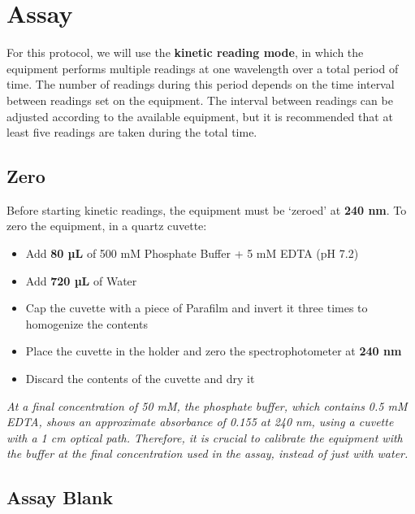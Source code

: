 \documentclass[
  9pt,
  american,
  a5paper,
  extrafontsizes,onecolumn,openright
  ]{memoir}
\providecommand{\tightlist}{%
  \setlength{\itemsep}{0pt}\setlength{\parskip}{0pt}}
\newlength{\rf}
\begin{document}
\section{Assay}\label{assay_general}

For this protocol, we will use the \textbf{kinetic reading mode}, in which the equipment performs multiple readings at one wavelength over a total period of time. The number of readings during this period depends on the time interval between readings set on the equipment. The interval between readings can be adjusted according to the available equipment, but it is recommended that at least five readings are taken during the total time.

\subsection{Zero}\label{cat_zero}

Before starting kinetic readings, the equipment must be \enquote*{zeroed} at \textbf{240 nm}. To zero the equipment, in a quartz cuvette:

\begin{itemize}
\tightlist
\item
  Add \textbf{80 µL} of 500 mM Phosphate Buffer + 5 mM EDTA (pH 7.2)
\item
  Add \textbf{720 µL} of Water
\item
  Cap the cuvette with a piece of Parafilm and invert it three times to homogenize the contents
\item
  Place the cuvette in the holder and zero the spectrophotometer at \textbf{240 nm}
\item
  Discard the contents of the cuvette and dry it
\end{itemize}

\begin{greybox}[frametitle = Note]
\emph{At a final concentration of 50 mM, the phosphate buffer, which contains 0.5 mM EDTA, shows an approximate absorbance of 0.155 at 240 nm, using a cuvette with a 1 cm optical path. Therefore, it is crucial to calibrate the equipment with the buffer at the final concentration used in the assay, instead of just with water.}

\end{greybox}

\subsection{Assay Blank}\label{cat_assay_blank}
\end{document}
